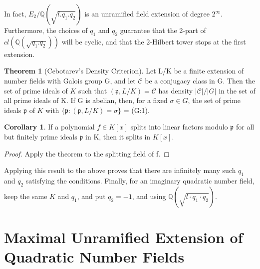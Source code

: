 \documentclass[12pt]{extarticle}
\newcommand{\Q}{\mathbb{Q}}
\newcommand{\<}{\langle}
\renewcommand{\>}{\rangle}
\theoremstyle{definition}
\newtheorem{theorem}{Theorem}
\newtheorem{corollary}{Corollary}
\begin{document}
\begin{center}
\end{center}
In fact, $E_2/\mathbb{Q}(\sqrt{l.q_1.q_2})$ is an unramified field extension of degree $2^{\infty}$. Furthermore, the choices of $q_1$ and $q_2$ guarantee that the 2-part of $cl(\mathbb{Q}(\sqrt{q_1.q_2}))$ will be cyclic, and that the 2-Hilbert tower stops at the first extension. 


\begin{theorem}[Cebotarev's Density Criterion]
Let L/K be a finite extension of
number fields with Galois group G, and let $\mathcal{C}$ be a conjugacy class in G. Then the set of
prime ideals of $K$ such that $(\mathfrak{p},L/K)=\mathcal{C}$ has density $|\mathcal{C}|/|G|$ in the set of all prime
ideals of K. If G is abelian, then, for a fixed $\sigma\in G$, the set of prime ideals $\mathfrak{p}$ of $K$ with $\{\mathfrak{p}:(\mathfrak{p},L/K)=\sigma\}$  = (G:1).
\end{theorem}
\begin{corollary}
 If a polynomial $f \in K[x]$ splits into linear factors modulo $\mathfrak{p}$ for all but finitely prime ideals $\mathfrak{p}$ in K, then it splits in $K[x]$.
\end{corollary}
\begin{proof}
Apply the theorem to the splitting field of f.
\end{proof}
Applying this result to the above proves that there are infinitely many such $q_1$ and $q_2$ satisfying the conditions.
Finally, for an imaginary quadratic number field, keep the same $K$ and $q_1$, and put $q_2=-1$, and using $\Q(\sqrt{l \cdot q_1 \cdot q_2})$. 




\section{Maximal Unramified Extension of Quadratic Number Fields}
\end{document}
